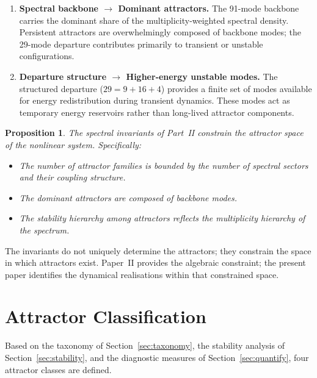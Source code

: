 \documentclass[12pt,a4paper]{article}
\newtheorem{proposition}{Proposition}
\begin{document}
\begin{enumerate}[nosep, leftmargin=*]
\item \textbf{Spectral backbone $\to$ Dominant attractors.}
The 91-mode backbone carries the dominant share of the
multiplicity-weighted spectral density.  Persistent attractors
are overwhelmingly composed of backbone modes; the 29-mode
departure contributes primarily to transient or unstable
configurations.

\item \textbf{Departure structure $\to$ Higher-energy unstable modes.}
The structured departure ($29 = 9 + 16 + 4$) provides a
finite set of modes available for energy redistribution during
transient dynamics.  These modes act as temporary energy
reservoirs rather than long-lived attractor components.

\end{enumerate}

\begin{proposition}
The spectral invariants of Part~II constrain the attractor space of
the nonlinear system.  Specifically:
\begin{itemize}[nosep]
\item The number of attractor families is bounded by the number of
  spectral sectors and their coupling structure.
\item The dominant attractors are composed of backbone modes.
\item The stability hierarchy among attractors reflects the
  multiplicity hierarchy of the spectrum.
\end{itemize}
\end{proposition}

The invariants do not uniquely determine the attractors; they constrain
the space in which attractors exist.  Paper~II provides the algebraic
constraint; the present paper identifies the dynamical realisations
within that constrained space.


\section{Attractor Classification}\label{sec:classification}

Based on the taxonomy of Section~\ref{sec:taxonomy}, the stability
analysis of Section~\ref{sec:stability}, and the diagnostic measures
of Section~\ref{sec:quantify}, four attractor classes are defined.
\end{document}
